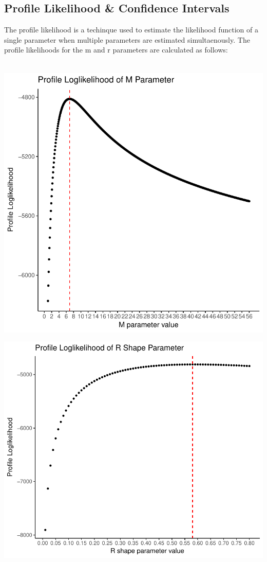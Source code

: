 \documentclass[11pt,preprint, authoryear]{elsarticle}
\numberwithin{equation}{section}
\numberwithin{figure}{section}
\numberwithin{table}{section}
\begin{document}
\subsection{Profile Likelihood \& Confidence
Intervals}\label{profile-likelihood-confidence-intervals}

The profile likelihood is a techinque used to estimate the likelihood
function of a single parameter when multiple parameters are estimated
simultaenously. The profile likelihoods for the m and r parameters are
calculated as follows:

\begin{align*}
\end{align*}

\includegraphics{likelihood_files/figure-latex/profile_likelihood_m-1.pdf}

\includegraphics{likelihood_files/figure-latex/profile_likelihood_r-1.pdf}
\end{document}
